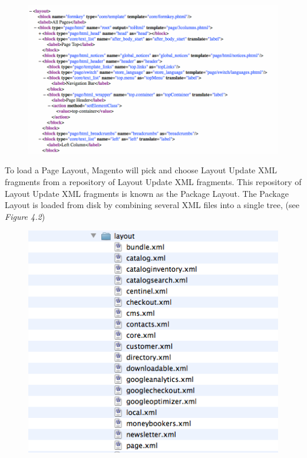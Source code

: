 \documentclass[oneside]{book}
\begin{document}
\begin{figure}[htb]
\begin{center}
\leavevmode
\includegraphics[width=1\textwidth]{images/chapter4/page-layout.png}
\end{center}
\caption{}
\end{figure}


To load a Page Layout, Magento will pick and choose Layout Update XML fragments from a repository of Layout Update XML fragments.  This repository of Layout Update XML fragments is known as the Package Layout. The Package Layout is loaded from disk by combining several XML files into a single tree, (see \emph{Figure 4.2})

\begin{figure}[htb]
\begin{center}
\leavevmode
\includegraphics[width=1\textwidth]{images/chapter4/package-layout-files.png}
\end{center}
\caption{}
\end{figure}
\end{document}
